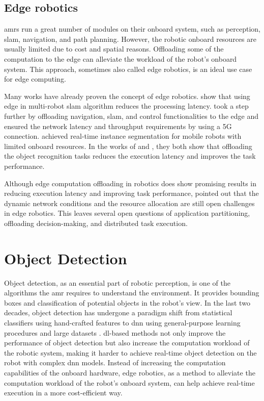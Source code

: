 \subsection{Edge robotics}

\glspl{amr} run a great number of modules on their onboard system, such as perception, \gls{slam}, navigation, and path planning. However, the robotic onboard resources are usually limited due to cost and spatial reasons. Offloading some of the computation to the edge can alleviate the workload of the robot's onboard system. This approach, sometimes also called edge robotics, is an ideal use case for edge computing. 

Many works have already proven the concept of edge robotics. \citeauthor*{Huang2022} \cite{Huang2022} show that using edge in multi-robot \gls{slam} algorithm reduces the processing latency. \citeauthor*{Sossalla2022} \cite{Sossalla2022} took a step further by offloading navigation, \gls{slam}, and control functionalities to the edge and ensured the network latency and throughput requirements by using a 5G connection. \citeauthor*{Xie2021} \cite{Xie2021} achieved real-time instance segmentation for mobile robots with limited onboard resources. In the works of \citeauthor*{Fu2019} \cite{Fu2019} and \citeauthor*{Tanwani} \cite{Tanwani}, they both show that offloading the object recognition tasks reduces the execution latency and improves the task performance. 

Although edge computation offloading in robotics does show promising results in reducing execution latency and improving task performance, \citeauthor*{Saeik2021} \cite{Saeik2021} pointed out that the dynamic network conditions and the resource allocation are still open challenges in edge robotics. This leaves several open questions of application partitioning, offloading decision-making, and distributed task execution. 

\section{Object Detection}\label{sec:object_detection}

Object detection, as an essential part of robotic perception, is one of the algorithms the \gls{amr} requires to understand the environment. It provides bounding boxes and classification of potential objects in the robot's view. In the last two decades, object detection has undergone a paradigm shift from statistical classifiers using hand-crafted features to \acrfull{dnn} using general-purpose learning procedures and large datasets \cite{RuizdelSolar2018}. \gls{dl}-based methods not only improve the performance of object detection but also increase the computation workload of the robotic system, making it harder to achieve real-time object detection on the robot with complex \gls{dnn} models. Instead of increasing the computation capabilities of the onboard hardware, edge robotics, as a method to alleviate the computation workload of the robot's onboard system, can help achieve real-time execution in a more cost-efficient way. 

